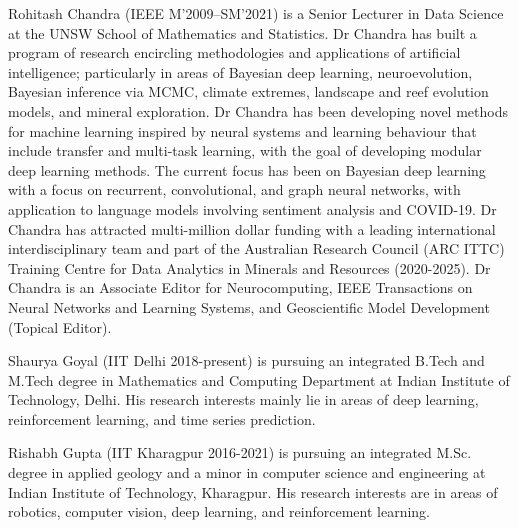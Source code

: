 \documentclass{ieeeaccess}
\begin{document}
 
 
 
 
 
 
 
 
 
 
 
 
 
 
 


 
\begin{IEEEbiography}{Rohitash Chandra} (IEEE M'2009--SM'2021) is a Senior Lecturer in Data Science at the UNSW School of Mathematics and Statistics. Dr Chandra has built a program of research encircling methodologies and applications of artificial intelligence; particularly in areas of Bayesian deep learning, neuroevolution, Bayesian inference via MCMC, climate extremes, landscape and reef evolution models, and mineral exploration.  Dr Chandra has been developing novel methods for machine learning inspired by neural systems and learning behaviour that include transfer and multi-task learning, with the goal of developing modular deep learning methods. The current focus has been on Bayesian deep learning with a focus on recurrent, convolutional, and graph neural networks, with application to language models involving sentiment analysis and COVID-19. Dr Chandra has attracted multi-million dollar funding with a leading international interdisciplinary team and  part of the Australian Research Council (ARC ITTC) Training Centre for Data Analytics in Minerals and Resources (2020-2025). Dr Chandra is an Associate Editor for Neurocomputing,   IEEE Transactions on Neural Networks and Learning Systems, and  Geoscientific Model Development (Topical Editor).


 
\end{IEEEbiography}
 

\begin{IEEEbiography}{Shaurya Goyal}  (IIT Delhi 2018-present) is  pursuing an integrated B.Tech and M.Tech degree in Mathematics and Computing Department at  Indian Institute of Technology, Delhi. His research interests mainly lie in areas of deep learning, reinforcement learning, and time series prediction.


 
\end{IEEEbiography}
 
\begin{IEEEbiography}{Rishabh Gupta} (IIT Kharagpur 2016-2021) is   pursuing an integrated M.Sc. degree in applied geology and a minor in computer science and engineering at Indian Institute of Technology, Kharagpur. His research interests are in areas of robotics, computer vision, deep learning, and reinforcement learning. 

 
\end{IEEEbiography}
 

 

 \EOD
\end{document}
